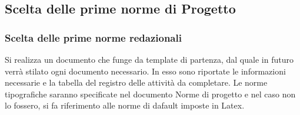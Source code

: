 \documentclass[11pt,a4paper]{article}
\begin{document}
	\subsection{Scelta delle prime norme di Progetto}	
	\subsubsection{Scelta delle prime norme redazionali}
	Si realizza un documento che funge da template di partenza, dal quale in futuro verrà stilato ogni documento necessario. In esso sono riportate le informazioni necessarie e la tabella del registro delle attività da completare. Le norme tipografiche saranno specificate nel documento Norme di progetto e nel caso non lo fossero, si fa riferimento alle norme di dafault imposte in Latex.
\end{document}
